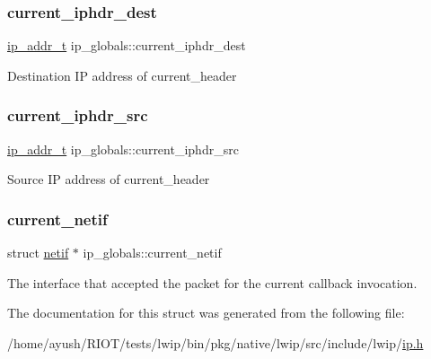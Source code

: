 \subsubsection{\texorpdfstring{current\+\_\+iphdr\+\_\+dest}{current\_iphdr\_dest}}
{\footnotesize\ttfamily \hyperlink{native_2lwip_2src_2include_2lwip_2ip__addr_8h_a88b43639738c4de2d3cd22e3a1fd7696}{ip\+\_\+addr\+\_\+t} ip\+\_\+globals\+::current\+\_\+iphdr\+\_\+dest}

Destination IP address of current\+\_\+header \mbox{\label{structip__globals_a04d85a3dc2c417050b3e088fa58a74b0}} 
\subsubsection{\texorpdfstring{current\+\_\+iphdr\+\_\+src}{current\_iphdr\_src}}
{\footnotesize\ttfamily \hyperlink{native_2lwip_2src_2include_2lwip_2ip__addr_8h_a88b43639738c4de2d3cd22e3a1fd7696}{ip\+\_\+addr\+\_\+t} ip\+\_\+globals\+::current\+\_\+iphdr\+\_\+src}

Source IP address of current\+\_\+header \mbox{\label{structip__globals_ac3ce50b618d04fe2c82e9525b10550ca}} 
\subsubsection{\texorpdfstring{current\+\_\+netif}{current\_netif}}
{\footnotesize\ttfamily struct \hyperlink{structnetif}{netif} $\ast$ ip\+\_\+globals\+::current\+\_\+netif}

The interface that accepted the packet for the current callback invocation. 

The documentation for this struct was generated from the following file\+:\begin{DoxyCompactItemize}
\item 
/home/ayush/\+R\+I\+O\+T/tests/lwip/bin/pkg/native/lwip/src/include/lwip/\hyperlink{native_2lwip_2src_2include_2lwip_2ip_8h}{ip.\+h}\end{DoxyCompactItemize}
